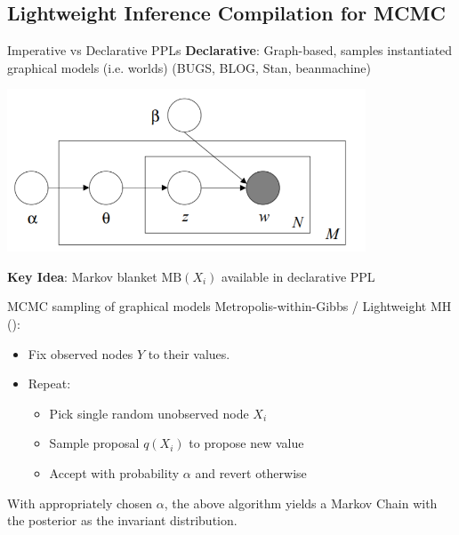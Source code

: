 \documentclass[12pt]{beamer}
\begin{document}
\subsection{Lightweight Inference Compilation for MCMC}

\begin{frame}{Imperative vs Declarative PPLs}
        \textbf{Declarative}: Graph-based, samples instantiated graphical models (i.e. worlds)
            (BUGS, BLOG, Stan, beanmachine)

        \includegraphics[width=0.8\textwidth]{figures/LDA.png}

        \textbf{Key Idea}: Markov blanket $\text{MB}(X_i)$ available in
        declarative PPL
\end{frame}

\begin{frame}[fragile]{MCMC sampling of graphical models}
    Metropolis-within-Gibbs / Lightweight MH (\cite{wingate2011lightweight}):
    \begin{itemize}
        \item Fix observed nodes $Y$ to their values.
        \item Repeat:
        \begin{itemize}
            \item Pick single random unobserved node $X_i$
            \item Sample proposal $q(X_i)$ to propose new value
            \item Accept with probability $\alpha$ and revert otherwise
        \end{itemize}
    \end{itemize}

    \pause
    
    \begin{theorem}
        With appropriately chosen $\alpha$, the above algorithm yields
        a Markov Chain with the posterior as the invariant distribution.
    \end{theorem}

\end{frame}
\end{document}
